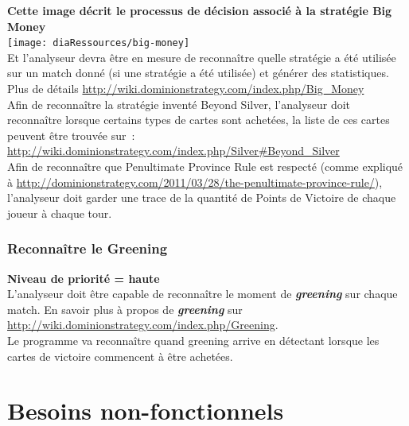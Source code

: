 \textbf{Cette image décrit le processus de décision associé à la stratégie Big Money}\\
\texttt{[image: diaRessources/big-money]}\\
Et l'analyseur devra être en mesure de reconnaître quelle stratégie a été utilisée sur un match donné (si une  stratégie a été utilisée) et générer des statistiques.\\
Plus de détails \url{http://wiki.dominionstrategy.com/index.php/Big_Money}\\

Afin de reconnaître la stratégie inventé Beyond Silver, l'analyseur doit reconnaître lorsque certains types de cartes sont achetées, la liste de ces cartes peuvent être trouvée sur : \url{http://wiki.dominionstrategy.com/index.php/Silver#Beyond_Silver}\\

Afin de reconnaître que Penultimate Province Rule est respecté (comme expliqué à \url{http://dominionstrategy.com/2011/03/28/the-penultimate-province-rule/}), l’analyseur doit garder une trace de la quantité de Points de Victoire de chaque joueur à chaque tour.

\subsubsection{Reconnaître le Greening}
\textbf{Niveau de priorité = haute}\\

L'analyseur doit être capable de reconnaître le moment de \textit{\textbf{greening}} sur chaque match.
En savoir plus à propos de \textit{\textbf{greening}} sur \url{http://wiki.dominionstrategy.com/index.php/Greening}.\\
Le programme va reconnaître quand greening arrive en détectant lorsque les cartes de victoire commencent à être achetées.

\newpage

\section{Besoins non-fonctionnels}

